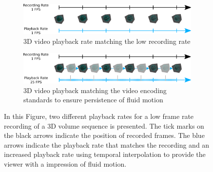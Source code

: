 \begin{figure}[H]
    \centering
    \begin{subfigure}[b]{0.96\textwidth}
        \includegraphics[width=\textwidth]{images/01_introduction/motivation_temporal_superresolution_one.pdf}
        \caption{3D video playback rate matching the low recording rate}
        \label{subfig:playback_rate_matching}
    \end{subfigure}
    
	\vspace{1.0cm}
    
    \begin{subfigure}[b]{0.96\textwidth}
        \includegraphics[width=\textwidth]{images/01_introduction/motivation_temporal_superresolution_two.pdf}
        \caption{3D video playback matching the video encoding standards to ensure persistence of fluid motion}
        \label{subfig:playback_rate_higher}
    \end{subfigure}
    \caption[Concept of Temporal Super Resolution in a 3D Video Player]{In this Figure, two different playback rates for a low frame rate recording of a 3D volume sequence is presented. The tick marks on the black arrows indicate the position of recorded frames. The blue arrows indicate the playback rate that matches the recording  and an increased playback rate  using temporal interpolation to provide the viewer with a impression of fluid motion. }
    \label{fig:temporal_superresolution}
\end{figure}
